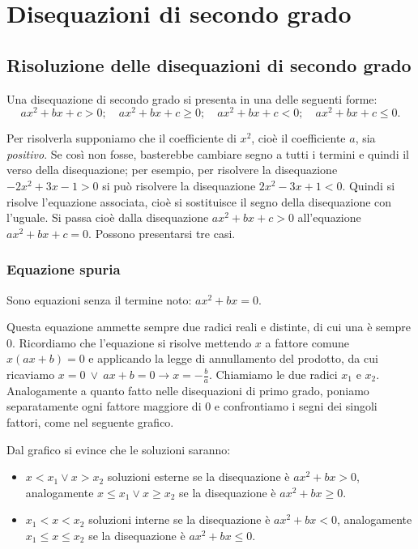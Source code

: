 \chapter{Disequazioni di secondo grado}

\section{Risoluzione delle disequazioni di secondo grado}

Una disequazione di secondo grado si presenta in una delle seguenti forme:
\[ax^2+bx+c>0;\quad ax^2+bx+c\ge 0;\quad ax^2+bx+c<0;\quad ax^2+bx+c\le 0.\]

Per risolverla supponiamo che il coefficiente di $x^2$, cioè il coefficiente $a$, sia \textit{positivo}. Se così non fosse, basterebbe cambiare segno a tutti i termini e quindi il verso della disequazione; per esempio, per risolvere la disequazione $-2x^2+3x-1>0$ si può risolvere la disequazione $2x^2-3x+1<0$.
Quindi si risolve l'equazione associata, cioè si sostituisce il segno della disequazione con l'uguale. Si passa cioè dalla disequazione $ax^2+bx+c>0$ all'equazione $ax^2+bx+c=0$. Possono presentarsi tre casi.

\subsection{Equazione spuria}
Sono equazioni senza il termine noto: $ax^2+bx=0$.

Questa equazione ammette sempre due radici reali e distinte, di cui una è sempre $0$. Ricordiamo che l'equazione si risolve mettendo $x$ a fattore comune $x(ax+b)=0$ e applicando la legge di annullamento del prodotto, da cui ricaviamo $x=0\ \vee \ ax+b=0\rightarrow x=-\frac b a$. Chiamiamo le due radici $x_1$ e $x_2$. Analogamente a quanto fatto nelle disequazioni di primo grado, poniamo separatamente ogni fattore maggiore di $0$ e confrontiamo i segni dei singoli fattori, come nel seguente grafico.
\begin{center}

\end{center}
Dal grafico si evince che le soluzioni saranno:
\begin{itemize}
\item $x<x_1\vee x>x_2$ soluzioni esterne se la disequazione è $ax^2+bx>0$, analogamente $x\le x_1\vee x\ge x_2$ se la disequazione è $ax^2+bx\ge 0$.
\item $x_1<x<x_2$ soluzioni interne se la disequazione è $ax^2+bx<0$, analogamente $x_1\le x\le x_2$ se la disequazione è $ax^2+bx\le 0$.
\end{itemize}

